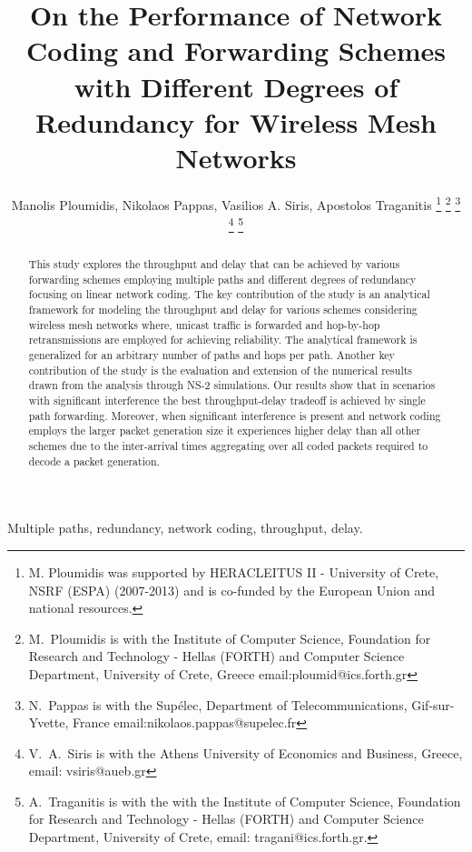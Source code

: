 \documentclass[journal, onecolumn, 12pt]{IEEEtran}
\begin{document}
\title{On the Performance of Network Coding and Forwarding Schemes with Different Degrees of Redundancy for Wireless Mesh Networks}
\author{Manolis Ploumidis, Nikolaos Pappas, Vasilios A. Siris, Apostolos Traganitis
\thanks{M. Ploumidis was supported by HERACLEITUS II -
University of Crete, NSRF (ESPA) (2007-2013) and is co-funded by the
European Union and national resources.}
\thanks{M.~Ploumidis is with the
Institute of Computer Science, Foundation for Research and Technology - Hellas (FORTH)
and Computer Science Department, University of Crete, Greece email:ploumid@ics.forth.gr}
\thanks{N.~Pappas is with the Sup\'{e}lec, Department of Telecommunications, Gif-sur-Yvette, France email:nikolaos.pappas@supelec.fr}
\thanks{V.~A.~Siris is with the Athens University of Economics and Business, Greece, email: vsiris@aueb.gr}
\thanks{A.~Traganitis is with the with the
Institute of Computer Science, Foundation for Research and Technology - Hellas (FORTH)
and Computer Science Department, University of Crete, email: tragani@ics.forth.gr.}}

 \maketitle

\begin{abstract}
This study explores the throughput and delay that can be achieved by various forwarding schemes employing multiple paths and different degrees of redundancy focusing on linear network coding.
The key contribution of the study is an analytical framework for modeling the throughput and delay for various schemes considering wireless mesh networks where, unicast traffic is forwarded and hop-by-hop retransmissions
are employed for achieving reliability.
The analytical framework is generalized for an arbitrary number of paths and hops per path.
Another key contribution of the study is the evaluation and extension of the numerical results drawn from the analysis through NS-2 simulations.
Our results show that in scenarios with significant interference the best throughput-delay tradeoff is achieved by single path forwarding.
Moreover, when significant interference is present and network coding employs the larger packet generation size it experiences higher delay than all other schemes due to the inter-arrival times
aggregating over all coded packets required to decode a packet generation.

\end{abstract}

\begin{keywords}
Multiple paths, redundancy, network coding, throughput, delay.
\end{keywords}
\end{document}
